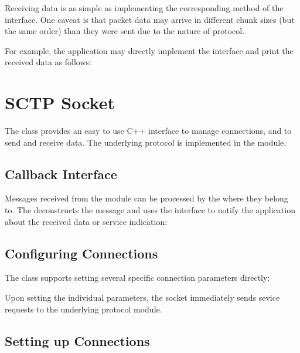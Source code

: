 Receiving data is as simple as implementing the corresponding method of the
 interface. One caveat is that packet data may
arrive in different chunk sizes (but the same order) than they were sent due to
the nature of  protocol.

For example, the application may directly implement the
 interface and print the received data as
follows:


\section{SCTP Socket}
\label{sec:sockets:sctp-socket}

The  class provides an easy to use C++ interface to manage
 connections, and to send and receive data. The underlying
 protocol is implemented in the  module.

\subsection*{Callback Interface}

Messages received from the  module can be processed by the
 where they belong to. The 
deconstructs the message and uses the  interface
to notify the application about the received data or service indication:


\subsection*{Configuring Connections}

The  class supports setting several 
specific connection parameters directly:


Upon setting the individual parameters, the socket immediately sends sevice
requests to the underlying  protocol module.

\subsection*{Setting up Connections}

